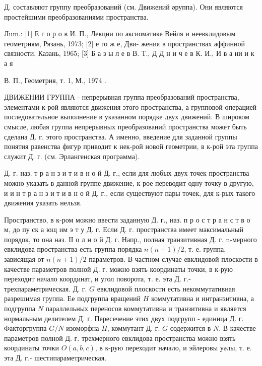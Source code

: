 \documentclass[10pt]{article}
\begin{document}
Д. составляют группу преобразований (см. Движений әруппа). Они являются простейшими преобразованиями пространства.



Лum.: [1] Е г о р о в И. П., Лекции по аксиоматике Вейля и неевклидовым геометриям, Рязань, 1973; [2] е го ж е, Дви- жения в пространствах аффинной связности, Казань, 1965; [3] Б а з ы л е в В. Т., Д Д н и ч е в К. И., И в а ни и к а я

В. П., Геометрия, т. 1, М., 1974 .



ДВИЖЕНИИ ГРУППА - непрерывная группа преобразований пространства, элементами к-рой являются движения этого пространства, а групповой операцией последовательное выполнение в указанном порядке двух движений. В широком смысле, любая группа непрерывных преобразований пространства может быть сделана Д. г. этого пространства. А именно, введение для заданной группы понятия равенства фигур приводит к нек-рой новой геометрии, в к-рой эта группа служит Д. г. (см. Эрлангенская программа).



Д. г. наз. т р а н з и т и в н о й Д. г., если для любых двух точек пространства можно указать в данной группе движение, к-рое переводит одну точку в другую, и и н т р а н з и т и в н о й Д. г., если существуют пары точек, для к-рых такого движения указать нельзя.



Пространство, в к-ром можно ввести заданную Д. г., наз. п р о с т р а н с т в о м, до пу ск а ющ им э т у Д. г. Если Д. г. пространства имеет максимальный порядок, то она наз. ІІ о л н о й Д. г. Напр., полная транзитивная Д. г. n-мерного евклидова пространства есть группа порядка $n(n+1) / 2$, т. е. группа, зависящая от $n(n+1) / 2$ параметров. В частном случае евклидовой плоскости в качестве параметров полной Д. г. можно взять координаты точки, в к-рую переходит начало координат, и угол поворота, т. е. эта Д. г.- трехпараметрическая. Д. г. $G$ евклидовой плоскости есть некоммутативная разрешимая группа. Ее подгруппа вращений $H$ коммутативна и интранзитивна, а подгруппа $N$ параллельных переносов коммутативна и транзитивна и является нормальным делителем Д. г. Пересечение этих двух подгрупп - единица Д. г. Факторгруппа $G / N$ изоморфна $H$, коммутант Д. г. $G$ содержится в $N$. В качестве параметров полной Д. г. трехмерного евклидова пространства можно взять координаты точки $O(a, b, c)$, в к-рую переходит начало, и эйлеровы уәлы, т. е. эта Д. г.- шестипараметрическая.
\end{document}
